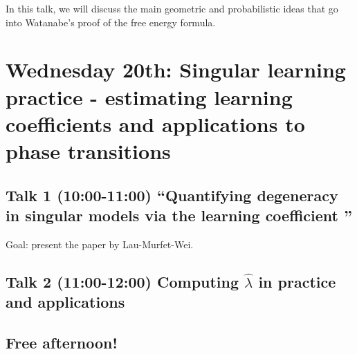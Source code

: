 \documentclass[a4paper,11pt]{amsart}
\newcommand{\lambdahat}{\widehat{\lambda}}
\begin{document}
In this talk, we will discuss the main geometric and probabilistic ideas that go into Watanabe's proof of the free energy formula.  

\section*{Wednesday 20th: Singular learning practice - estimating learning coefficients and applications to phase transitions}

\subsection*{Talk 1 (10:00-11:00) ``Quantifying degeneracy in singular models via the learning coefficient ''}

Goal: present the paper \cite{lambdahat} by Lau-Murfet-Wei.

\subsection*{Talk 2 (11:00-12:00) Computing $\lambdahat$ in practice and applications}

\subsection*{Free afternoon!}






\end{document}
